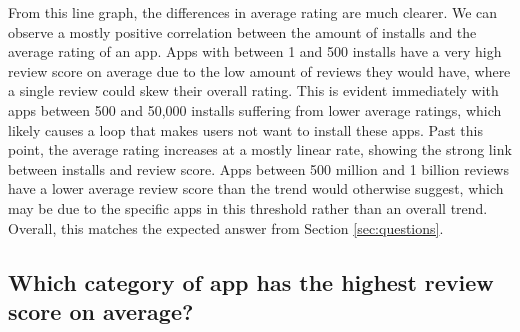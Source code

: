 \documentclass[12pt]{report}\usepackage[]{graphicx}\usepackage[]{xcolor}
\begin{document}
From this line graph, the differences in average rating are much clearer. We can observe a mostly positive
correlation between the amount of installs and the average rating of an app. Apps with between 1 and 500 
installs have a very high review score on average due to the low amount of reviews they would have, where 
a single review could skew their overall rating. This is evident immediately with apps between 500
and 50,000 installs suffering from lower average ratings, which likely causes a loop that makes users not
want to install these apps. Past this point, the average rating increases at a mostly linear rate, showing
the strong link between installs and review score. Apps between 500 million and 1 billion reviews have a lower
average review score than the trend would otherwise suggest, which may be due to the specific apps in this 
threshold rather than an overall trend.\\

Overall, this matches the expected answer from Section \ref{sec:questions}.

\pagebreak
\subsection{Which category of app has the highest review score on average?}
\end{document}

